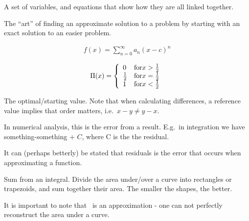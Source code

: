 \begin{definition}
    A set of variables, and equations that show how they are all linked 
    together.
\end{definition}

\begin{definition}\label{pertubation}
    The ``art'' of finding an approximate solution to a problem by starting
    with an exact solution to an easier problem.
\end{definition}


\begin{definition}\label{powerseries}
    \begin{align}
        f(x) = \sum\limits_{n=0}^{\infty}{a_{n}{(x-c)}^{n}}
    \end{align}
\end{definition}

\begin{definition}
    $$
    \Pi(x) = \left\{
            \begin{array}{l l}
                0 & \text{for} x > \frac{1}{2} \\
                \frac{1}{2} & \text{for} x = \frac{1}{2} \\
                1 & \text{for} x < \frac{1}{2} \\
            \end{array}
        \right.
    $$
\end{definition}

\begin{definition}
    The optimal/starting value. Note that when calculating differences,
    a reference value implies that order matters, i.e.\ $x - y \neq y - x$.

\end{definition}

\begin{definition}[Residual]
    In numerical analysis, this is the error from a result.
    E.g.\ in integration we have something-something + $C$, where C is the 
    the residual.

    It can (perhaps betterly) be stated that residuals is the error that occurs
    when approximating a function.

\end{definition}

\begin{definition}\label{riemannsum}
    Sum from an integral. Divide the area under/over a curve into rectangles
    or trapezoids, and sum together their area. The smaller the shapes, the
    better.

    It is important to note that~ is an approximation - 
    one can not perfectly reconstruct the area under a curve.
\end{definition}


